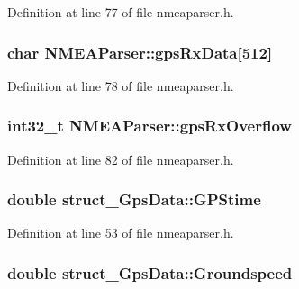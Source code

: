 \-Definition at line 77 of file nmeaparser.\-h.

\hypertarget{group___g_p_s_gadget_plugin_gaef781170a93672b3bbc887fcabdcb369}{
\subsubsection[{gps\-Rx\-Data}]{\setlength{\rightskip}{0pt plus 5cm}char {\bf \-N\-M\-E\-A\-Parser\-::gps\-Rx\-Data}\mbox{[}512\mbox{]}}}\label{group___g_p_s_gadget_plugin_gaef781170a93672b3bbc887fcabdcb369}


\-Definition at line 78 of file nmeaparser.\-h.

\hypertarget{group___g_p_s_gadget_plugin_gaf0b70b48a4a5943f40dc14c11b8e0712}{
\subsubsection[{gps\-Rx\-Overflow}]{\setlength{\rightskip}{0pt plus 5cm}int32\-\_\-t {\bf \-N\-M\-E\-A\-Parser\-::gps\-Rx\-Overflow}}}\label{group___g_p_s_gadget_plugin_gaf0b70b48a4a5943f40dc14c11b8e0712}


\-Definition at line 82 of file nmeaparser.\-h.

\hypertarget{group___g_p_s_gadget_plugin_gaeedda11a0db9fe353ca149906deccb9f}{
\subsubsection[{\-G\-P\-Stime}]{\setlength{\rightskip}{0pt plus 5cm}double {\bf struct\-\_\-\-Gps\-Data\-::\-G\-P\-Stime}}}\label{group___g_p_s_gadget_plugin_gaeedda11a0db9fe353ca149906deccb9f}


\-Definition at line 53 of file nmeaparser.\-h.

\hypertarget{group___g_p_s_gadget_plugin_ga96522460814507cd49570c6edbecdc4a}{
\subsubsection[{\-Groundspeed}]{\setlength{\rightskip}{0pt plus 5cm}double {\bf struct\-\_\-\-Gps\-Data\-::\-Groundspeed}}}\label{group___g_p_s_gadget_plugin_ga96522460814507cd49570c6edbecdc4a}


